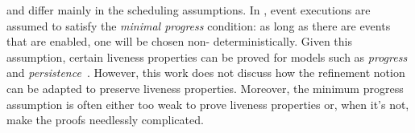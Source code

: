 
\unitb and \eventB differ mainly in the scheduling
assumptions.  In \eventB, event executions are assumed to
satisfy the \emph{minimal progress} condition: as long
as there are events that are enabled, one will be chosen non-
deterministically. %
Given this assumption, certain liveness properties can be proved
for \eventB models such as \emph{progress} and
\emph{persistence}~\cite{hoang11:_reason_liven_proper_event_b}.
However, this work does not discuss how the refinement notion can be
adapted to preserve liveness properties.  Moreover, the
minimum progress assumption is often either too weak to prove
liveness properties or, when it's not, make the proofs needlessly 
complicated.

